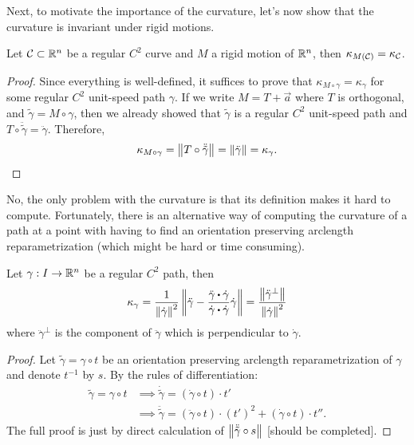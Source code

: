 Next, to motivate the importance of the curvature, let's now show that the curvature is invariant under rigid motions.

\begin{proposition}
    Let $\mathcal{C} \subset \mathbb{R}^n$ be a regular $C^2$ curve and $M$ a rigid motion of $\mathbb{R}^n$, then $\kappa_{M(\mathcal{C})} = \kappa_{\mathcal{C}}$.
\end{proposition}

\begin{proof}
    Since everything is well-defined, it suffices to prove that $\kappa_{M\circ \gamma} = \kappa_{\gamma}$ for some regular $C^2$ unit-speed path $\gamma$. If we write $M = T + \vec{a}$ where $T$ is orthogonal, and $\tilde{\gamma} = M \circ \gamma$, then we already showed that $\tilde{\gamma}$ is a regular $C^2$ unit-speed path and $T \circ \ddot{\tilde{\gamma}} = \ddot{\gamma}$. Therefore, 
    $$\kappa_{M\circ \gamma}  = \left\lVert T \circ \ddot{\tilde{\gamma}} \right\rVert = \left\lVert\ddot{\gamma} \right\rVert = \kappa_{\gamma}.$$
\end{proof}

No, the only problem with the curvature is that its definition makes it hard to compute. Fortunately, there is an alternative way of computing the curvature of a path at a point with having to find an orientation preserving arclength reparametrization (which might be hard or time consuming). 

\begin{proposition}
    Let $\gamma : I \to \mathbb{R}^n$ be a regular $C^2$ path, then
    $$\kappa_{\gamma} = \frac{1}{\norm{\dot{\gamma}}^2}\norm{\ddot{\gamma} - \frac{\ddot{\gamma}\bigcdot \dot{\gamma}}{\dot{\gamma}\bigcdot \dot{\gamma}}\dot{\gamma}} = \frac{\norm{\ddot{\gamma}^{\perp}}}{\norm{\dot{\gamma}}^2}$$
    where $\ddot{\gamma}^{\perp}$ is the component of $\ddot{\gamma}$ which is perpendicular to $\dot{\gamma}$.
\end{proposition}

\begin{proof}
    Let $\tilde{\gamma} = \gamma \circ t$ be an orientation preserving arclength reparametrization of $\gamma$ and denote $t^{-1}$ by $s$. By the rules of differentiation:
    \begin{align*}
        \tilde{\gamma} = \gamma \circ t &\implies \dot{\tilde{\gamma}} = (\dot{\gamma}\circ t) \cdot t' \\
        &\implies \ddot{\tilde{\gamma}} = (\ddot{\gamma}\circ t) \cdot (t')^2 + (\dot{\gamma}\circ t) \cdot t''.
    \end{align*}
    The full proof is just by direct calculation of $\left\lVert\ddot{\tilde{\gamma}} \circ s \right\rVert$ [should be completed].
\end{proof}

